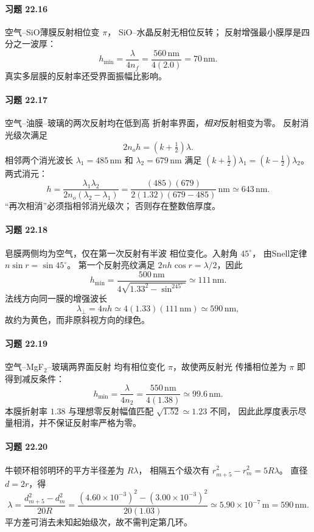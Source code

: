 \paragraph{习题 22.16}
空气--SiO薄膜反射相位变 \(\pi\)，
SiO--水晶反射无相位反转；
反射增强最小膜厚是四分之一波厚：
\[
\boxed{h_{\min}=\frac{\lambda}{4n_f}
=\frac{560\,\mathrm{nm}}{4(2.0)}
=70\,\mathrm{nm}}.
\]
真实多层膜的反射率还受界面振幅比影响。

\paragraph{习题 22.17}
空气--油膜--玻璃的两次反射均在低到高
折射率界面，\emph{相对}反射相变为零。
反射消光级次满足
\[
2n_oh=(k+\tfrac12)\lambda.
\]
相邻两个消光波长 \(\lambda_1=485\,\mathrm{nm}\)
和 \(\lambda_2=679\,\mathrm{nm}\) 满足
\((k+\frac12)\lambda_1=(k-\frac12)\lambda_2\)。
两式消元：
\[
\boxed{h=\frac{\lambda_1\lambda_2}
{2n_o(\lambda_2-\lambda_1)}
=\frac{(485)(679)}
{2(1.32)(679-485)}\,\mathrm{nm}
\simeq643\,\mathrm{nm}}.
\]
“再次相消”必须指相邻消光级次；
否则存在整数倍厚度。

\paragraph{习题 22.18}
皂膜两侧均为空气，仅在第一次反射有半波
相位变化。入射角 \(45^\circ\)，
由Snell定律
\(n\sin r=\sin45^\circ\)。
第一个反射亮纹满足
\(2nh\cos r=\lambda/2\)，因此
\[
\boxed{h_{\min}=\frac{500\,\mathrm{nm}}
{4\sqrt{1.33^2-\sin^245^\circ}}
\simeq111\,\mathrm{nm}}.
\]
法线方向同一膜的增强波长
\[
\boxed{\lambda_\perp=4nh
\simeq4(1.33)(111\,\mathrm{nm})
\simeq590\,\mathrm{nm}},
\]
故约为黄色，而非原斜视方向的绿色。

\paragraph{习题 22.19}
空气--MgF\(_2\)--玻璃两界面反射
均有相位变化 \(\pi\)，故使两反射光
传播相位差为 \(\pi\) 即得到减反条件：
\[
\boxed{h_{\min}=\frac{\lambda}{4n_2}
=\frac{550\,\mathrm{nm}}{4(1.38)}
\simeq99.6\,\mathrm{nm}}.
\]
本膜折射率 \(1.38\) 与理想零反射幅值匹配
\(\sqrt{1.52}\simeq1.23\) 不同，
因此此厚度表示尽量相消，并不保证反射率严格为零。

\paragraph{习题 22.20}
牛顿环相邻明环的平方半径差为 \(R\lambda\)，
相隔五个级次有
\(r_{m+5}^2-r_m^2=5R\lambda\)。
直径 \(d=2r\)，得
\[
\boxed{\lambda=\frac{d_{m+5}^2-d_m^2}{20R}
=\frac{(4.60\times10^{-3})^2-(3.00\times10^{-3})^2}
{20(1.03)}
\simeq5.90\times10^{-7}\,\mathrm m
=590\,\mathrm{nm}}.
\]
平方差可消去未知起始级次，故不需判定第几环。


